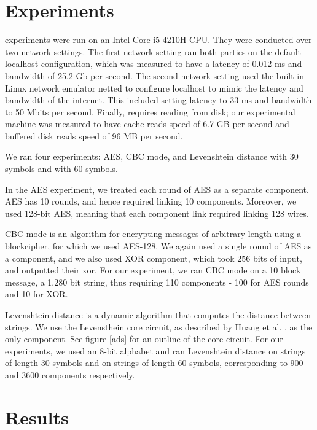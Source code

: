 \section{Experiments}

\CompGC experiments were run on an Intel Core i5-4210H CPU. 
They were conducted over two network settings. 
The first network setting ran both parties on the default localhost configuration, which was measured to have a latency of 0.012 ms and bandwidth of 25.2 Gb per second. 
The second network setting used the built in Linux network emulator {\sf netted} to configure localhost to mimic the latency and bandwidth of the internet. 
This included setting latency to 33 ms and bandwidth to 50 Mbits per second. 
Finally, \CompGC requires reading from disk; our experimental machine was measured to have cache reads speed of 6.7 GB per second and buffered disk reads speed of 96 MB per second.

We ran four experiments: AES, CBC mode, and Levenshtein distance with 30 symbols and with 60 symbols. 

In the AES experiment, we treated each round of AES as a separate component. AES has 10 rounds, and hence required linking 10 components. Moreover, we used 128-bit AES, meaning that each component link required linking 128 wires. 

CBC mode is an algorithm for encrypting messages of arbitrary length using a blockcipher, for which we used AES-128. 
We again used a single round of AES as a component, and we also used XOR component, which took 256 bits of input, and outputted their xor. 
For our experiment, we ran CBC mode on a 10 block message, a 1,280 bit string, thus requiring 110 components - 100 for AES rounds and 10 for XOR. 

Levenshtein distance is a dynamic algorithm that computes the distance between strings. 
We use the Levensthein core circuit, as described by Huang et al. \cite{asdf}, as the only component. 
See figure \ref{ads} for an outline of the core circuit. 
For our experiments, we used an 8-bit alphabet and ran Levenshtein distance on strings of length 30 symbols and on strings of length 60 symbols, corresponding to 900 and 3600 components respectively. 

\section{Results}


